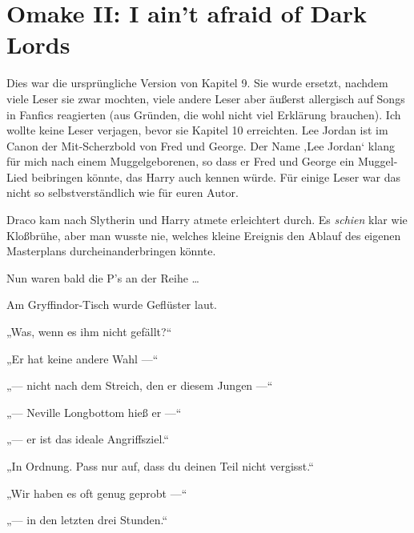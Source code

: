 


\section{Omake II: I ain’t afraid of Dark Lords}

Dies war die ursprüngliche Version von Kapitel 9. Sie wurde ersetzt, nachdem viele Leser sie zwar mochten, viele andere Leser aber äußerst allergisch auf Songs in Fanfics reagierten (aus Gründen, die wohl nicht viel Erklärung brauchen). Ich wollte keine Leser verjagen, bevor sie Kapitel 10 erreichten. Lee Jordan ist im Canon der Mit-Scherzbold von Fred und George. Der Name ‚Lee Jordan‘ klang für mich nach einem Muggelgeborenen, so dass er Fred und George ein Muggel-Lied beibringen könnte, das Harry auch kennen würde. Für einige Leser war das nicht so selbstverständlich wie für euren Autor.

\later

Draco kam nach Slytherin und Harry atmete erleichtert durch. Es \emph{schien} klar wie Kloßbrühe, aber man wusste nie, welches kleine Ereignis den Ablauf des eigenen Masterplans durcheinanderbringen könnte.

Nun waren bald die P’s an der Reihe …

Am Gryffindor-Tisch wurde Geflüster laut.
\begin{em}
„Was, wenn es ihm nicht gefällt?“

„Er hat keine andere Wahl —“

„— nicht nach dem Streich, den er diesem Jungen —“

„— Neville Longbottom hieß er —“

„— er ist das ideale Angriffsziel.“

„In Ordnung. Pass nur auf, dass du deinen Teil nicht vergisst.“

„Wir haben es oft genug geprobt —“

„— in den letzten drei Stunden.“
\end{em}

